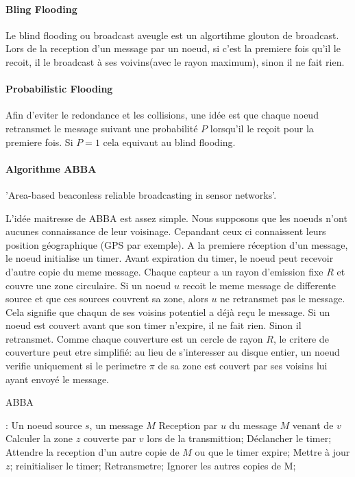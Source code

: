 \paragraph{Bling Flooding}

Le blind flooding ou broadcast aveugle est un algortihme glouton de broadcast. Lors de la reception d'un message par un noeud, si c'est la premiere fois qu'il le recoit, il le broadcast à ses voivins(avec le rayon maximum), sinon il
 ne fait rien.

\paragraph{Probabilistic Flooding}

Afin d'eviter le redondance et les collisions, une idée est que chaque noeud retransmet le message suivant une probabilité $P$ lorsqu'il le reçoit pour la premiere fois.
Si $P=1$ cela equivaut au blind flooding.

\paragraph{Algorithme ABBA}
'Area-based beaconless reliable broadcasting in
sensor networks'\cite{Abba2006}.

L'idée maitresse de ABBA est assez simple. Nous supposons que les noeuds n'ont aucunes connaissance de leur voisinage. Cepandant ceux ci connaissent leurs position géographique (GPS par exemple).
A la premiere réception d'un message, le noeud initialise un timer. Avant expiration du timer, le noeud peut recevoir d'autre copie du meme message. Chaque capteur a un rayon d'emission fixe $R$
et couvre une zone circulaire. Si un noeud $u$ recoit le meme message de differente source et que ces sources couvrent sa zone, alors $u$ ne retransmet pas le message.
Cela signifie que chaqun de ses voisins potentiel a déjà reçu le message. Si un noeud est couvert avant que son timer n'expire, il ne fait rien. Sinon il retransmet.
Comme chaque couverture est un cercle de rayon $R$, le critere de couverture peut etre simplifié: au lieu de s'interesser au disque entier, un noeud verifie uniquement si le perimetre $\pi$ de sa zone est couvert par 
ses voisins lui ayant envoyé le message. 

\begin{algorithm}[h]
\caption{ABBA}
\label{ABBA}
\begin{algorithmic}
\REQUIRE:
Un noeud source $s$, un message $M$
\STATE Reception  par  $u$ du message $M$ venant de $v$
\STATE Calculer la zone $z$ couverte par $v$ lors de la transmittion;
\STATE Déclancher le timer;
\REPEAT
    \STATE Attendre la reception d'un autre copie de $M$ ou que le timer expire;
	\STATE Mettre à jour $z$;
	\STATE reinitialiser le timer;
    \ENDIF
{}
    \STATE Retransmetre;
\ENDIF
     \STATE Ignorer les autres copies de M;

\end{algorithmic}
\end{algorithm}




